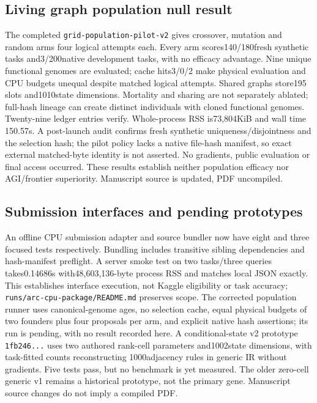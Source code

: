 \documentclass[11pt]{article}
\begin{document}
\subsection{Living graph population null result}
The completed \texttt{grid-population-pilot-v2} gives crossover, mutation and
random arms four logical attempts each. Every arm scores140/180fresh synthetic
tasks and3/200native development tasks, with no efficacy advantage. Nine unique
functional genomes are evaluated; cache hits3/0/2 make physical evaluation and
CPU budgets unequal despite matched logical attempts. Shared graphs store195
slots and1010state dimensions. Mortality and sharing are not separately ablated;
full-hash lineage can create distinct individuals with cloned functional genomes.
Twenty-nine ledger entries verify. Whole-process RSS is73{,}804KiB and wall time
150.57s. A post-launch audit confirms fresh synthetic uniqueness/disjointness
and the selection hash; the pilot policy lacks a native file-hash manifest, so
exact external matched-byte identity is not asserted. No gradients, public
evaluation or final access occurred. These results establish neither population
efficacy nor AGI/frontier superiority. Manuscript source is updated, PDF uncompiled.

\subsection{Submission interfaces and pending prototypes}
An offline CPU submission adapter and source bundler now have eight and three
focused tests respectively. Bundling includes transitive sibling dependencies
and hash-manifest preflight. A server smoke test on two tasks/three queries
takes0.14686s with48{,}603{,}136-byte process RSS and matches local JSON exactly.
This establishes interface execution, not Kaggle eligibility or task accuracy;
\texttt{runs/arc-cpu-package/README.md} preserves scope.
The corrected population runner uses canonical-genome ages, no selection cache,
equal physical budgets of two founders plus four proposals per arm, and explicit
native hash assertions; its run is pending, with no result recorded here.
A conditional-state v2 prototype \texttt{1fb246...} uses two authored rank-cell
parameters and1002state dimensions, with task-fitted counts reconstructing
1000adjacency rules in generic IR without gradients. Five tests pass, but no
benchmark is yet measured. The older zero-cell generic v1 remains a historical
prototype, not the primary gene. Manuscript source changes do not imply a compiled PDF.
\end{document}
